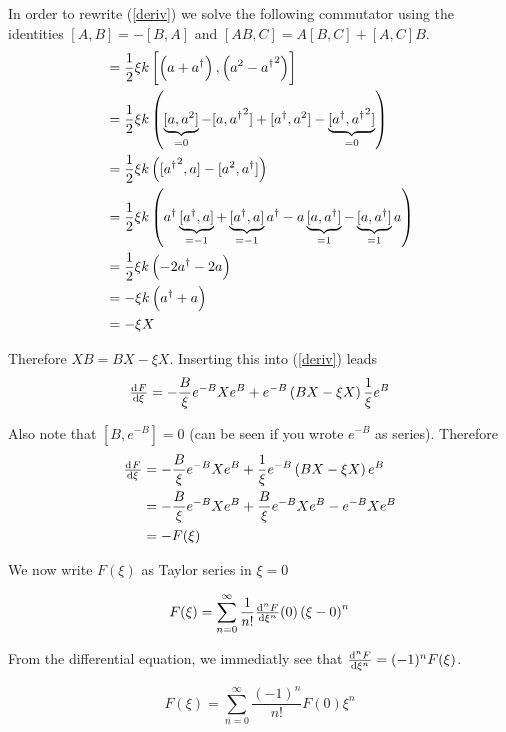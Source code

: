\documentclass[a4paper,german,12pt,smallheadings]{scrartcl}
\begin{document}
\begin{enumerate}[a)]
    In order to rewrite (\ref{deriv}) we solve the following commutator using
    the identities $[A,B] = -[B,A]$ and $[AB,C] = A[B,C] + [A,C]B$.
    \begin{align*}
      [X,B] &= \frac{1}{2} \xi k \left[\del{a+a^\dagger}, \del{a^2 - {a^\dagger}^2}\right] \\
            &= \frac{1}{2} \xi k \del{\underbrace{[a,a^2]}_{=0} - [a,{a^\dagger}^2] + [a^\dagger, a^2] - \underbrace{[a^\dagger, {a^\dagger}^2]}_{=0}} \\
            &= \frac{1}{2} \xi k \del{[{a^\dagger}^2, a] - [a^2, a^\dagger]} \\
            &= \frac{1}{2} \xi k \del{a^\dagger \underbrace{[a^\dagger,a] }_{=-1}+ \underbrace{[a^\dagger, a]}_{=-1}a^\dagger - a\underbrace{[a,a^\dagger]}_{=1} - \underbrace{[a,a^\dagger]}_{=1}a} \\
            &= \frac{1}{2} \xi k \del{-2a^\dagger -2a} \\
            &= -\xi k \del{a^\dagger + a} \\
            &= -\xi X
    \end{align*}

    Therefore $XB = BX - \xi X$. Inserting this into (\ref{deriv}) leads
    \begin{equation}
      \od{F}{\xi} = -\frac{B}{\xi}e^{-B}Xe^B + e^{-B} \del{BX - \xi X} \frac{1}{\xi}e^B
    \end{equation}

    Also note that $[B,e^{-B}] = 0$ (can be seen if you wrote $e^{-B}$ as series). Therefore
    \begin{align*}
      \od{F}{\xi} &= -\frac{B}{\xi}e^{-B}Xe^B + \frac{1}{\xi} e^{-B} \del{BX - \xi X} e^B \\
                  &= -\frac{B}{\xi}e^{-B}Xe^B + \frac{B}{\xi} e^{-B}Xe^B - e^{-B}Xe^{B} \\
                  &= -F(\xi)
    \end{align*}

    We now write $F(\xi)$ as Taylor series in $\xi = 0$

    \begin{equation*}
      F(\xi) = \sum_{n=0}^\infty \frac{1}{n!} \od[n]{F}{\xi}(0) \del{\xi - 0}^n
    \end{equation*}

    From the differential equation, we immediatly see that $\od[n]{F}{\xi} = (-1)^n F(\xi)$.

    \begin{equation*}
      F(\xi) = \sum_{n=0}^\infty \frac{(-1)^n}{n!} F(0) \xi^n
    \end{equation*}


\end{enumerate}
\end{document}
